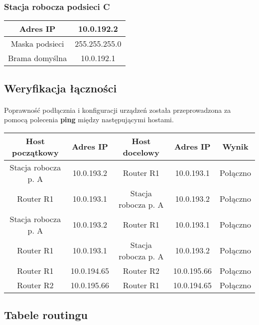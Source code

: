 \documentclass[wide,a4paper,titlepage,12pt] {article}
\begin{document}
  \subsubsection{Stacja robocza podsieci C}
  \begin{center}
    \begin{tabular}{|c|c|}
      \hline
      Adres IP & 10.0.192.2 \\
      \hline
      Maska podsieci & 255.255.255.0 \\
      \hline
      Brama domyślna & 10.0.192.1 \\
      \hline
    \end{tabular}
  \end{center}

  \subsection{Weryfikacja łączności}
  \paragraph{}
  Poprawność podłącznia i konfiguracji urządzeń została przeprowadzona za pomocą polecenia \textbf{ping} między następującymi hostami.

  \begin{center}
    \begin{tabular}{|c|c||c|c||c|}
      \hline
      Host początkowy & Adres IP & Host docelowy & Adres IP & Wynik \\
      \hline
      Stacja robocza p. A & 10.0.193.2 & Router R1 & 10.0.193.1 & Połączno \\
      Router R1 & 10.0.193.1 & Stacja robocza p. A & 10.0.193.2 & Połączno \\
      Stacja robocza p. A & 10.0.193.2 & Router R1 & 10.0.193.1 & Połączno \\
      Router R1 & 10.0.193.1 & Stacja robocza p. A & 10.0.193.2 & Połączno \\

      Router R1 & 10.0.194.65 & Router R2 & 10.0.195.66 & Połączno \\
      Router R2 & 10.0.195.66 & Router R1 & 10.0.194.65 & Połączno \\
      \hline
    \end{tabular}
  \end{center}

  \subsection{Tabele routingu}
\end{document}

